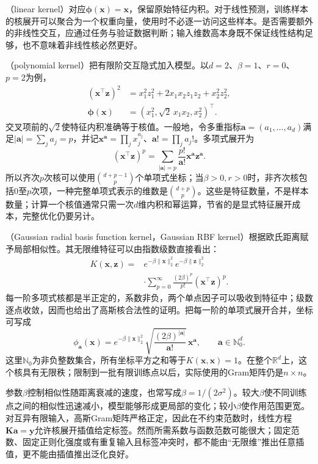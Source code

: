 （linear kernel）对应$\bm{\phi}(\bm{x})=\bm{x}$，保留原始特征内积。对于线性预测，训练样本的核展开可以聚合为一个权重向量，使用时不必逐一访问这些样本。是否需要额外的非线性交互，应通过任务与验证数据判断；输入维数高本身既不保证线性结构足够，也不意味着非线性核必然更好。

（polynomial kernel）把有限阶交互隐式加入模型。以$d=2$、$\beta=1$、$r=0$、$p=2$为例，
\[
  \begin{aligned}
    (\bm{x}^{\top}\bm{z})^2
      &=x_1^2z_1^2+2x_1x_2z_1z_2+x_2^2z_2^2,\\
    \bm{\phi}(\bm{x})
      &=(x_1^2,\sqrt2\,x_1x_2,x_2^2)^{\top}.
  \end{aligned}
\]
交叉项前的$\sqrt2$使特征内积准确等于核值。一般地，令多重指标$\bm{a}=(a_1,\ldots,a_d)$满足$|\bm{a}|=\sum_j a_j=p$，并记$\bm{x}^{\bm{a}}=\prod_j x_j^{a_j}$、$\bm{a}!=\prod_j a_j!$。多项式展开为
\[
  (\bm{x}^{\top}\bm{z})^p
  =\sum_{|\bm{a}|=p}\frac{p!}{\bm{a}!}
     \bm{x}^{\bm{a}}\bm{z}^{\bm{a}}.
\]
所以齐次$p$次核可以使用$\binom{d+p-1}{p}$个单项式坐标；当$\beta>0,r>0$时，非齐次核包括$0$至$p$次项，一种完整单项式表示的维数是$\binom{d+p}{p}$。这些是特征数量，不是样本数量；计算一个核值通常只需一次$d$维内积和幂运算，节省的是显式特征展开成本，完整优化仍要另计。

（Gaussian radial basis function kernel，Gaussian RBF kernel）根据欧氏距离赋予局部相似性。其无限维特征可以由指数级数直接看出：
\begin{equation}
  \begin{aligned}
    K(\bm{x},\bm{z})
      ={}&e^{-\beta\lVert\bm{x}\rVert_2^2}
          e^{-\beta\lVert\bm{z}\rVert_2^2}\\
       &\cdot\sum_{p=0}^{\infty}
          \frac{(2\beta)^p}{p!}
          (\bm{x}^{\top}\bm{z})^p.
  \end{aligned}
  \label{eq:classification-svm-rbf-expansion}
\end{equation}
每一阶多项式核都是半正定的，系数非负，两个单点因子可以吸收到特征中；级数逐点收敛，因而也给出了高斯核合法性的证明。把每一阶的单项式展开合并，坐标可写成
\[
  \phi_{\bm{a}}(\bm{x})
  =e^{-\beta\lVert\bm{x}\rVert_2^2}
     \sqrt{\frac{(2\beta)^{|\bm{a}|}}{\bm{a}!}}\,
     \bm{x}^{\bm{a}},
  \qquad \bm{a}\in\mathbb{N}_0^d.
\]
这里$\mathbb{N}_0$为非负整数集合，所有坐标平方之和等于$K(\bm{x},\bm{x})=1$。在整个$\mathbb{R}^d$上，这个核具有无限秩；限制到一批有限训练点以后，实际使用的Gram矩阵仍是$n\times n$。

参数$\beta$控制相似性随距离衰减的速度，也常写成$\beta=1/(2\sigma^2)$。较大$\beta$使不同训练点之间的相似性迅速减小，模型能够形成更局部的变化；较小$\beta$使作用范围更宽。对互异有限输入，高斯Gram矩阵严格正定，因此在不约束范数时，线性方程$\bm{K}\bm{a}=\bm{y}$允许核展开插值给定标签。然而所需系数与函数范数可能很大；固定范数、固定正则化强度或有重复输入且标签冲突时，都不能由“无限维”推出任意插值，更不能由插值推出泛化良好。

